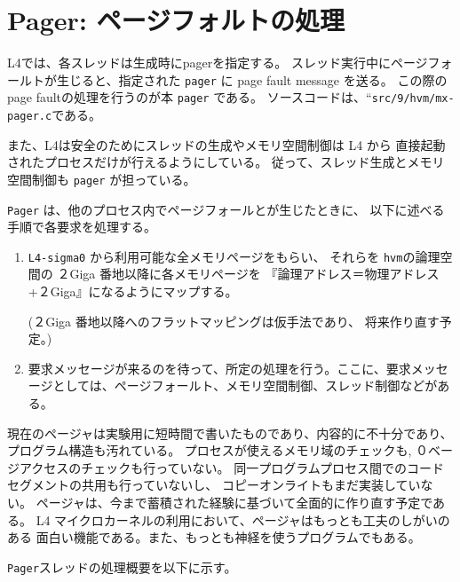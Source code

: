 \chapter{Pager: ページフォルトの処理}

      L4では、各スレッドは生成時にpagerを指定する。
      スレッド実行中にページフォールトが生じると、指定された {\tt pager} に
      page fault message を送る。
      この際のpage faultの処理を行うのが本 {\tt pager} である。
      ソースコードは、``\verb|src/9/hvm/mx-pager.c|である。

      また、L4は安全のためにスレッドの生成やメモリ空間制御は L4 から
      直接起動されたプロセスだけが行えるようにしている。
      従って、スレッド生成とメモリ空間制御も {\tt pager} が担っている。 

      {\tt Pager} は、他のプロセス内でページフォールとが生じたときに、
      以下に述べる手順で各要求を処理する。

\begin{enumerate}
\item     {\tt L4-sigma0} から利用可能な全メモリページをもらい、
         それらを {\tt hvm}の論理空間の ２Giga 番地以降に各メモリページを
         『論理アドレス＝物理アドレス+２Giga』になるようにマップする。

         (２Giga 番地以降へのフラットマッピングは仮手法であり、
         将来作り直す予定。)

\item   要求メッセージが来るのを待って、所定の処理を行う。ここに、要求メッセージとしては、ページフォールト、メモリ空間制御、スレッド制御などがある。
\end{enumerate}    

      現在のページャは実験用に短時間で書いたものであり、内容的に不十分であり、
      プログラム構造も汚れている。
      プロセスが使えるメモリ域のチェックも, ０ベージアクセスのチェックも行っていない。
      同一プログラムプロセス間でのコードセグメントの共用も行っていないし、
      コピーオンライトもまだ実装していない。
      ページャは、今まで蓄積された経験に基づいて全面的に作り直す予定である。
      L4 マイクロカーネルの利用において、ページャはもっとも工夫のしがいのある
      面白い機能である。また、もっとも神経を使うプログラムでもある。 


{\tt Pager}スレッドの処理概要を以下に示す。

